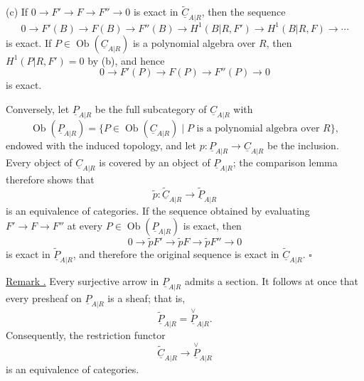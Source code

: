 (c) If
$0\longrightarrow F'\longrightarrow F\longrightarrow F''
\longrightarrow0$ is exact in
$\widetilde{\underline C}_{A|R}$, then the sequence
\[
 0\longrightarrow F'(B)\longrightarrow F(B)
 \longrightarrow F''(B)
 \longrightarrow H^1(B|R,F')\longrightarrow H^1(B|R,F)
 \longrightarrow\cdots
\]
is exact. If $P\in\operatorname{Ob}(\underline C_{A|R})$ is a
polynomial algebra over $R$, then $H^1(P|R,F')=0$ by (b), and hence
\[
 0\longrightarrow F'(P)\longrightarrow F(P)
 \longrightarrow F''(P)\longrightarrow0
\]
is exact.

Conversely, let $\underline P_{A|R}$ be the full subcategory of
$\underline C_{A|R}$ with
\[
 \operatorname{Ob}(\underline P_{A|R})=
 \{P\in\operatorname{Ob}(\underline C_{A|R})\mid
   P\text{ is a polynomial algebra over }R\},
\]
endowed with the induced topology, and let
$p:\underline P_{A|R}\longrightarrow\underline C_{A|R}$ be the
inclusion. Every object of $\underline C_{A|R}$ is covered by an
object of $\underline P_{A|R}$; the comparison lemma therefore
shows that
\[
 \widetilde p:\widetilde{\underline C}_{A|R}
 \longrightarrow\widetilde{\underline P}_{A|R}
\]
is an equivalence of categories. If the sequence obtained by
evaluating $F'\longrightarrow F\longrightarrow F''$ at every
$P\in\operatorname{Ob}(\underline P_{A|R})$ is exact, then
\[
 0\longrightarrow\widetilde pF'\longrightarrow\widetilde pF
 \longrightarrow\widetilde pF''\longrightarrow0
\]
is exact in $\widetilde{\underline P}_{A|R}$, and therefore the
original sequence is exact in
$\widetilde{\underline C}_{A|R}$. \hfill$\square$


\underline{Remark .} Every surjective arrow in
$\underline P_{A|R}$ admits a section. It follows at once that every
presheaf on $\underline P_{A|R}$ is a sheaf; that is,
\[
 \widetilde{\underline P}_{A|R}=
 \overset{\vee}{\underline P}_{A|R}.
\]
Consequently, the restriction functor
\[
 \widetilde{\underline C}_{A|R}
 \longrightarrow\overset{\vee}{\underline P}_{A|R}
\]
is an equivalence of categories.
